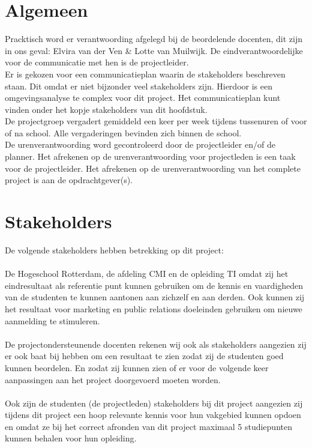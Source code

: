 \documentclass[oneside]{book}
\begin{document}
\section*{Algemeen}
Pracktisch word er verantwoording afgelegd bij de beordelende docenten, dit zijn in ons geval: Elvira van der Ven \& Lotte van Muilwijk.
De eindverantwoordelijke voor de communicatie met hen is de projectleider.\\
Er is gekozen voor een communicatieplan waarin de stakeholders beschreven staan.
Dit omdat er niet bijzonder veel stakeholders zijn.
Hierdoor is een omgevingsanalyse te complex voor dit project.
Het communicatieplan kunt vinden onder het kopje stakeholders van dit hoofdstuk.\\
De projectgroep vergadert gemiddeld een keer per week tijdens tussenuren of voor of na school.
Alle vergaderingen bevinden zich binnen de school.\\
De urenverantwoording word gecontroleerd door de projectleider en/of de planner.
Het afrekenen op de urenverantwoording voor projectleden is een taak voor de projectleider.
Het afrekenen op de urenverantwoording van het complete project is aan de opdrachtgever(s).
\section*{Stakeholders}
De volgende stakeholders hebben betrekking op dit project:\\
\\
De Hogeschool Rotterdam, de afdeling CMI en de opleiding TI omdat zij het eindresultaat als
referentie punt kunnen gebruiken om de kennis en vaardigheden van de studenten te kunnen
aantonen aan zichzelf en aan derden.
Ook kunnen zij het resultaat voor marketing en public relations doeleinden gebruiken om nieuwe
aanmelding te stimuleren.\\
\\
De projectondersteunende docenten rekenen wij ook als stakeholders aangezien zij er ook baat bij hebben om een resultaat te zien zodat zij de studenten goed kunnen beordelen.
En zodat zij kunnen zien of er voor de volgende keer aanpassingen aan het project doorgevoerd
moeten worden.\\
\\
Ook zijn de studenten (de projectleden) stakeholders bij dit project aangezien zij tijdens dit project
een hoop relevante kennis voor hun vakgebied kunnen opdoen en omdat ze bij het correct afronden
van dit project maximaal 5 studiepunten kunnen behalen voor hun opleiding.
\clearpage
\end{document}
